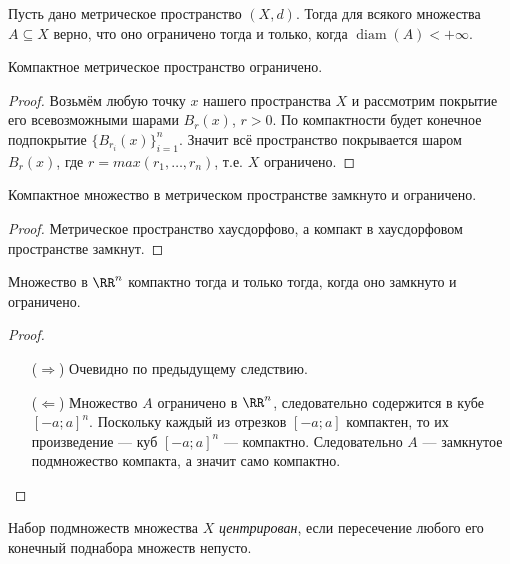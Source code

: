 \documentclass[12pt,a4paper]{article}
\DeclareMathOperator{\diam}{diam}
\begin{document}
    \begin{lemma}
        Пусть дано метрическое пространство $(X, d)$. Тогда для всякого множества $A \subseteq X$ верно, что оно ограничено тогда и только, когда $\diam(A) < +\infty$.
    \end{lemma}

    \begin{theorem}
        Компактное метрическое пространство ограничено.
    \end{theorem}

    \begin{proof}
        Возьмём любую точку $x$ нашего пространства $X$ и рассмотрим покрытие его всевозможными шарами $B_r(x)$, $r > 0$. По компактности будет конечное подпокрытие $\{B_{r_i}(x)\}_{i=1}^n$. Значит всё пространство покрывается шаром $B_r(x)$, где $r = max(r_1, \dots, r_n)$, т.е. $X$ ограничено.
    \end{proof}

    \begin{corollary}
        Компактное множество в метрическом пространстве замкнуто и ограничено.
    \end{corollary}

    \begin{proof}
        Метрическое пространство хаусдорфово, а компакт в хаусдорфовом пространстве замкнут.
    \end{proof}

    \begin{theorem}
        Множество в $\RR^n$ компактно тогда и только тогда, когда оно замкнуто и ограничено.
    \end{theorem}

    \begin{proof}\ 
        \begin{itemize}
            \item[($\Rightarrow$)] Очевидно по предыдущему следствию.
            \item[($\Leftarrow$)] Множество $A$ ограничено в $\RR^n$, следовательно содержится в кубе $[-a; a]^n$. Поскольку каждый из отрезков $[-a; a]$ компактен, то их произведение --- куб $[-a; a]^n$ --- компактно. Следовательно $A$ --- замкнутое подмножество компакта, а значит само компактно.
        \end{itemize}
    \end{proof}

    \begin{definition}
        Набор подмножеств множества $X$ \emph{центрирован}, если пересечение любого его конечный поднабора множеств непусто.
    \end{definition}
\end{document}
